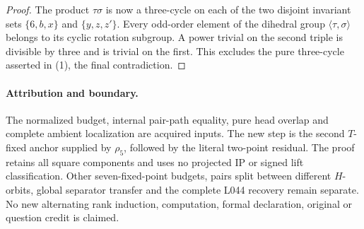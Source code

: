 \documentclass[11pt,a4paper]{article}
\newcommand{\gen}[1]{\langle#1\rangle}
\begin{document}
\begin{proof}
The product $\tau\sigma$ is now a three-cycle on
each of the two disjoint invariant sets
$\{6,b,x\}$ and $\{y,z,z'\}$. Every odd-order
element of the dihedral group $\gen{\tau,\sigma}$
belongs to its cyclic rotation subgroup. A power
trivial on the second triple is divisible by three
and is trivial on the first. This excludes the pure
three-cycle asserted in (1), the final contradiction.
\end{proof}

\paragraph{Attribution and boundary.}
The normalized budget, internal pair-path equality,
pure head overlap and complete ambient localization
are acquired inputs. The new step is the second
$T$-fixed anchor supplied by $\rho_5$, followed by
the literal two-point residual. The proof retains
all square components and uses no projected IP or
signed lift classification. Other seven-fixed-point
budgets, pairs split between different $H$-orbits,
global separator transfer and the complete L044
recovery remain separate. No new alternating rank
induction, computation, formal declaration, original
or question credit is claimed.
\end{document}
